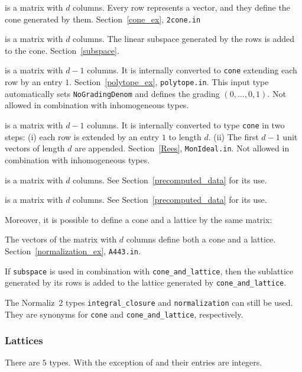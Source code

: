 \begin{itemize}
	\itemtt[cone] is a matrix with $d$ columns. Every row represents a vector, and they define the cone generated by them. Section~\ref{cone_ex}, \verb|2cone.in|
	
	\itemtt[subspace] is a matrix with $d$ columns. The linear subspace generated by the rows is added to the cone. Section~\ref{subspace}.
	
	\itemtt[polytope] is a matrix with $d-1$ columns. It is internally converted to \verb|cone| extending each row by an entry $1$. Section~\ref{polytope_ex}, \verb|polytope.in|. This input type automatically sets \verb|NoGradingDenom| and defines the grading $(0,\dots,0,1)$. Not allowed in combination with inhomogeneous types.
	
	 is a matrix with $d-1$ columns. It is internally converted to type \verb|cone| in two steps: (i) each row is extended by an entry $1$ to length $d$. (ii) The first $d-1$ unit vectors of length $d$ are appended. Section~\ref{Rees}, \verb|MonIdeal.in|. Not allowed in combination with inhomogeneous types.
	
	 is a matrix with $d$ columns. See Section~\ref{precomputed_data} for its use.
	
	 is a matrix with $d$ columns. See Section~\ref{precomputed_data} for its use.
\end{itemize}

Moreover, it is possible to define a cone and a lattice by the same matrix:

\begin{itemize}
	 The vectors of the matrix with $d$ columns define both a cone and a lattice. Section~\ref{normalization_ex}, \verb|A443.in|.
	
	If \verb|subspace| is used in combination with \verb|cone_and_lattice|, then the sublattice generated by its rows is added to the lattice generated by \verb|cone_and_lattice|.
\end{itemize}


The Normaliz~2 types \verb|integral_closure| and \verb|normalization| can still be used. They are synonyms for \verb|cone| and \verb|cone_and_lattice|, respectively.

\subsubsection{Lattices}

There are $5$ types. With the exception of  and  their entries are integers.


